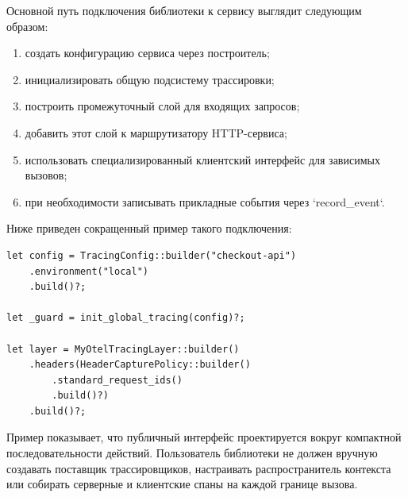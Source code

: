 Основной путь подключения библиотеки к сервису выглядит следующим образом:
\begin{enumerate}
    \item создать конфигурацию сервиса через построитель;
    \item инициализировать общую подсистему трассировки;
    \item построить промежуточный слой для входящих запросов;
    \item добавить этот слой к маршрутизатору HTTP-сервиса;
    \item использовать специализированный клиентский интерфейс для зависимых вызовов;
    \item при необходимости записывать прикладные события через `record_event`.
\end{enumerate}

Ниже приведен сокращенный пример такого подключения:

\begin{verbatim}
let config = TracingConfig::builder("checkout-api")
    .environment("local")
    .build()?;

let _guard = init_global_tracing(config)?;

let layer = MyOtelTracingLayer::builder()
    .headers(HeaderCapturePolicy::builder()
        .standard_request_ids()
        .build()?)
    .build()?;
\end{verbatim}

Пример показывает, что публичный интерфейс проектируется вокруг компактной
последовательности действий. Пользователь библиотеки не должен вручную создавать
поставщик трассировщиков, настраивать распространитель контекста или собирать
серверные и клиентские спаны на каждой границе вызова.

